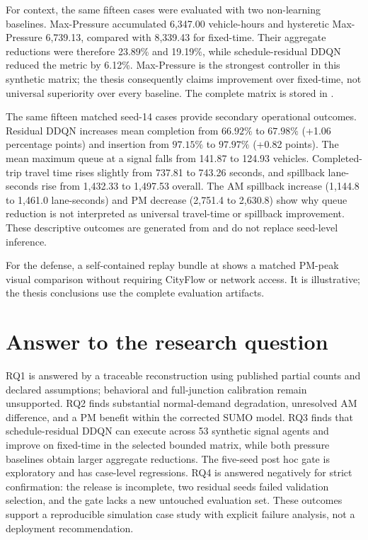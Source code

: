 \documentclass[12pt,a4paper]{report}
\begin{document}
For context, the same fifteen cases were evaluated with two non-learning
baselines. Max-Pressure accumulated 6,347.00 vehicle-hours and hysteretic
Max-Pressure 6,739.13, compared with 8,339.43 for fixed-time. Their aggregate
reductions were therefore 23.89\% and 19.19\%, while schedule-residual DDQN
reduced the metric by 6.12\%. Max-Pressure is the strongest controller in this
synthetic matrix; the thesis consequently claims improvement over fixed-time,
not universal superiority over every baseline. The complete matrix is stored
in .

The same fifteen matched seed-14 cases provide secondary operational outcomes.
Residual DDQN increases mean completion from $66.92\%$ to $67.98\%$ (+1.06
percentage points) and insertion from $97.15\%$ to $97.97\%$ (+0.82 points).
The mean maximum queue at a signal falls from 141.87 to 124.93 vehicles.
Completed-trip travel time rises slightly from 737.81 to 743.26 seconds, and
spillback lane-seconds rise from 1,432.33 to 1,497.53 overall. The AM spillback
increase (1,144.8 to 1,461.0 lane-seconds) and PM decrease (2,751.4 to 2,630.8)
show why queue reduction is not interpreted as universal travel-time or
spillback improvement. These descriptive outcomes are generated from
 and do
not replace seed-level inference.

For the defense, a self-contained replay bundle at
 shows a matched PM-peak visual
comparison without requiring CityFlow or network access. It is illustrative;
the thesis conclusions use the complete evaluation artifacts.

\section{Answer to the research question}
RQ1 is answered by a traceable reconstruction using published partial counts and declared assumptions; behavioral and full-junction calibration remain unsupported. RQ2 finds substantial normal-demand degradation, unresolved AM difference, and a PM benefit within the corrected SUMO model. RQ3 finds that schedule-residual DDQN can execute across 53 synthetic signal agents and improve on fixed-time in the selected bounded matrix, while both pressure baselines obtain larger aggregate reductions. The five-seed post hoc gate is exploratory and has case-level regressions. RQ4 is answered negatively for strict confirmation: the release is incomplete, two residual seeds failed validation selection, and the gate lacks a new untouched evaluation set. These outcomes support a reproducible simulation case study with explicit failure analysis, not a deployment recommendation.
\end{document}
